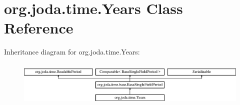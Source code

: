 \hypertarget{classorg_1_1joda_1_1time_1_1_years}{\section{org.\-joda.\-time.\-Years Class Reference}
\label{classorg_1_1joda_1_1time_1_1_years}
}
Inheritance diagram for org.\-joda.\-time.\-Years\-:\begin{figure}[H]
\begin{center}
\leavevmode
\includegraphics[height=2.187500cm]{classorg_1_1joda_1_1time_1_1_years}
\end{center}
\end{figure}
